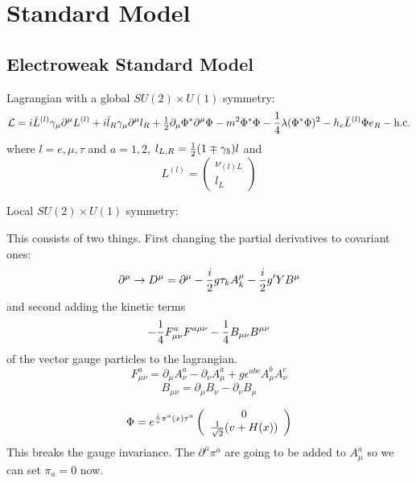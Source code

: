 \section{Standard Model}

\subsection{Electroweak Standard Model}

Lagrangian with a global $SU(2)\times U(1)$ symmetry: 
\begin{equation*}
  {\mathcal L}=i\bar L^{(l)}\gamma_\mu\partial^\mu L^{(l)}+i\bar l_R \gamma_\mu\partial^\mu l_R +{\textstyle{1\over2}} \partial_\mu\Phi^*\partial^\mu\Phi-m^2\Phi^*\Phi-{1\over4} \lambda(\Phi^*\Phi)^2 -h_e\bar L^{(l)} \Phi e_R - \hbox{h.c.}
\end{equation*}
where $l=e,\mu,\tau$ and $a=1,2$, $l_{L,R} = {\textstyle{1\over2}} (1\mp\gamma_5)l$ and 
\begin{equation*}
  L^{(l)} = \left( \begin{array}{c} \nu_{(l)L} \\ l_L \end{array} \right)
\end{equation*}

Local $SU(2)\times U(1)$ symmetry:

This consists of two things. First changing the partial derivatives to covariant ones: 
\begin{equation*}
  \partial^\mu \to D^\mu =\partial^\mu-{i\over2}g\tau_k A_k^\mu - {i\over2}g'YB^\mu
\end{equation*}
and second adding the kinetic terms 
\begin{equation*}
  -{1\over4}F^a_{\mu\nu}F^{a\mu\nu}-{1\over4}B_{\mu\nu}B^{\mu\nu}
\end{equation*}
of the vector gauge particles to the lagrangian. 
\begin{equation*}
  F^a_{\mu\nu} = \partial_\mu A^a_\nu-\partial_\nu A^a_\mu+ g\epsilon^{abc}A^b_\mu A^c_\nu
\end{equation*}
\begin{equation*}
  B_{\mu\nu} = \partial_\mu B_\nu-\partial_\nu B_\mu
\end{equation*}

\begin{equation*}
  \Phi = e^{{i\over v}\pi^a(x)\tau^a} \left( \begin{array}{c} 0 \\ {1\over\sqrt{2}}(v+H(x)) \end{array} \right)
\end{equation*}
This breaks the gauge invariance. The $\partial^\mu\pi^a$ are going to be added to $A^a_\mu$ so we can set $\pi_a = 0$ now. 
